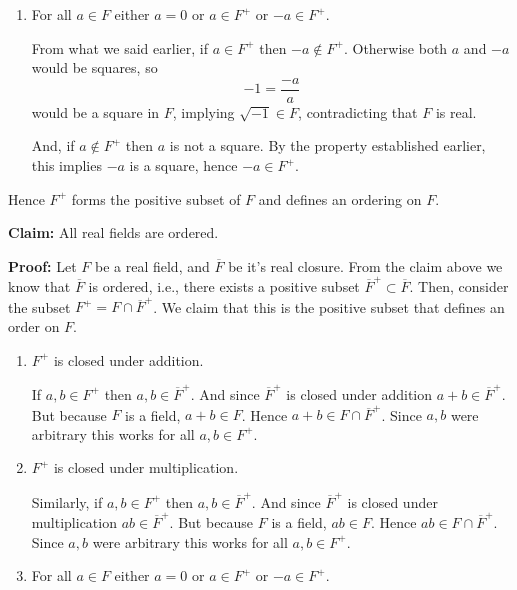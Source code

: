 \documentclass[12pt]{article}
\begin{document}
\begin{solution}
\begin{enumerate}
\begin{enumerate}
\begin{enumerate}
                    \item For all $a \in F$ either $a = 0$ or $a \in F^+$ or $-a \in F^+$. 
                    
                    From what we said earlier, if $a \in F^+$ then $-a\notin F^+$. Otherwise both $a$ and $-a$ would be squares, so
                    \[-1 = \frac{-a}{a}\]
                    would be a square in $F$, implying $\sqrt{-1}\in F$, contradicting that $F$ is real.
                    
                    And, if $a\notin F^+$ then $a$ is not a square. By the property established earlier, this implies $-a$ is a square, hence $-a\in F^+$.
                \end{enumerate}
                
                Hence $F^+$ forms the positive subset of $F$ and defines an ordering on $F$. 

            
            \bbni 

            \textbf{Claim:} All real fields are ordered. 
            
            \textbf{Proof:} Let $F$ be a real field, and $\overline{F}$ be it's real closure. From the claim above we know that $\overline{F}$ is ordered, i.e., there exists a positive subset $\overline{F}^+ \subset \overline{F}$. Then, consider the subset $F^+ = F \cap \overline{F}^+$. We claim that this is the positive subset that defines an order on $F$. 
            \begin{enumerate}
                    \item $F^+$ is closed under addition. 
                    
                    If $a, b \in F^+$ then $a, b \in \overline{F}^+$. And since $\overline{F}^+$ is closed under addition $a + b \in \overline{F}^+$. But because $F$ is a field, $a +b \in F$. Hence $a + b \in F \cap \overline{F}^+$. Since $a, b$ were arbitrary this works for all $a, b \in F^+$.
                    
                    \item $F^+$ is closed under multiplication. 
                    
                    Similarly, if $a, b \in F^+$ then $a, b \in \overline{F}^+$. And since $\overline{F}^+$ is closed under multiplication $ab \in \overline{F}^+$. But because $F$ is a field, $ab \in F$. Hence $ab \in F \cap \overline{F}^+$. Since $a, b$ were arbitrary this works for all $a, b \in F^+$.

                    \item For all $a \in F$ either $a = 0$ or $a \in F^+$ or $-a \in F^+$. 
                    

\end{enumerate}
\end{enumerate}
\end{enumerate}
\end{solution}
\end{document}
